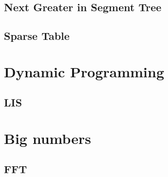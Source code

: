 \subsection{Next Greater in Segment Tree}

\subsection{Sparse Table}


\section{Dynamic Programming}

\subsection{LIS}


\section{Big numbers}
\subsection{FFT}
\inputminted[mathescape,tabsize=2]{cpp}{../BigNum/FFT.cpp}

